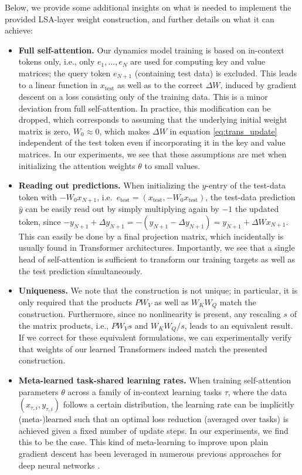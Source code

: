 \documentclass{article}
\theoremstyle{plain}
\theoremstyle{definition}
\theoremstyle{remark}
\begin{document}
Below, we provide some additional insights on what is needed to implement the provided LSA-layer weight construction, and further details on what it can achieve:
\begin{itemize}
\item \textbf{Full self-attention.} Our dynamics model training is based on in-context tokens only, i.e., only $e_1, \ldots, e_N$ are used for computing key and value matrices; the query token $e_{N+1}$ (containing test data) is excluded. This leads to a linear function in $x_{\text{test}}$ as well as to the correct $\Delta W$, induced by gradient descent on a loss consisting only of the training data. This is a minor deviation from full self-attention. In practice, this modification can be dropped, which corresponds to assuming that the underlying initial weight matrix is zero, $W_0 \approx 0$, which makes $\Delta W$ in equation \ref{eq:trans_update} independent of the test token even if incorporating it in the key and value matrices. In our experiments, we see that these assumptions are met when initializing the attention weights $\theta$ to small values.

\item \textbf{Reading out predictions.} When initializing the $y$-entry of the test-data token with $-W_0 x_{N+1}$, i.e.~$e_\text{test} = (x_{\text{test}}, -W_0 x_{\text{test}})$, the test-data prediction $\hat{y}$ can be easily read out by simply multiplying again by $-1$ the updated token, since  $-y_{N+1} + \Delta y_{N+1} = - (y_{N+1} - \Delta y_{N+1}) = y_{N+1} + \Delta W x_{N+1}$. This can easily be done by a final projection matrix, which incidentally is usually found in Transformer architectures. Importantly, we see that a single head of self-attention is sufficient to transform our training targets as well as the test prediction simultaneously. 

\item \textbf{Uniqueness.} We note that the construction is not unique; in particular, it is only required that the products $PW_V$ as well as $W_KW_Q$ match the construction. Furthermore, since no nonlinearity is present,  any rescaling $s$ of the matrix products, i.e., $PW_Vs$  and $W_KW_Q/s$, leads to an equivalent result. If we correct for these equivalent formulations, we can experimentally verify that weights of our learned Transformers indeed match the presented construction. 

\item \textbf{Meta-learned task-shared learning rates.} When training self-attention parameters $\theta$ across a family of in-context learning tasks $\tau$, where the data $(x_{\tau,i},y_{\tau,i})$ follows a certain distribution, the learning rate can be implicitly (meta-)learned such that an optimal loss reduction (averaged over tasks) is achieved given a fixed number of update steps. In our experiments, we find this to be the case. This kind of meta-learning to improve upon plain gradient descent has been leveraged in numerous previous approaches for deep neural networks   \citep{DBLP:journals/corr/LiZCL17,lee2018gradient,DBLP:conf/nips/ParkO19,zhao_meta_learning_hypernetworks,flennerhag2020metalearning}.


\end{itemize}
\end{document}
